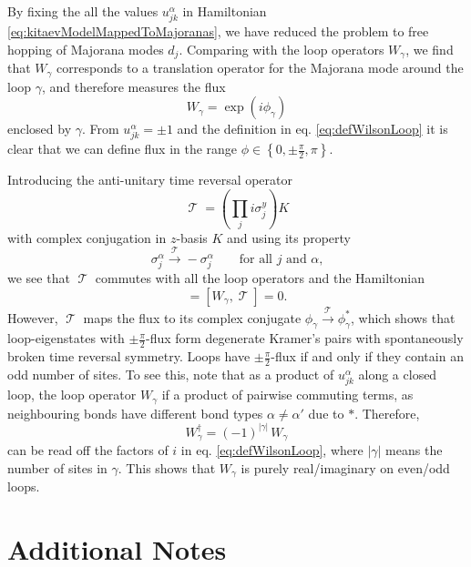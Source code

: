 \documentclass[%
fontsize=12pt, %
twoside=off %
]{scrbook}
\DeclareMathOperator{\trs}{\mathcal{T}}
\begin{document}
By fixing the all the values $u_{jk}^\alpha$ in Hamiltonian \ref{eq:kitaevModelMappedToMajoranas}, we have reduced the problem to free hopping of Majorana modes $d_j$. Comparing with the loop operators $W_\gamma$, we find that $W_\gamma$ corresponds to a translation operator for the Majorana mode around the loop $\gamma$, and therefore measures the flux
\begin{equation}
	W_\gamma = \exp\left(i \phi_\gamma\right)
\end{equation}
enclosed by $\gamma$. From $u_{jk}^\alpha=\pm 1$ and the definition in eq. \ref{eq:defWilsonLoop} it is clear that we can define flux in the range $\phi\in\left\{0,\pm\frac{\pi}{2},\pi\right\}$. 

Introducing the anti-unitary time reversal operator
\begin{equation}
	\trs = \left(\prod_j i\sigma_j^y\right)K
\end{equation}
with complex conjugation in $z$-basis $K$ and using its property
\begin{equation}
	\sigma_j^\alpha\stackrel{\trs}{\rightarrow}-\sigma_j^\alpha\qquad\text{for all $j$ and $\alpha$,}
\end{equation} 
we see that $\trs$ commutes with all the loop operators and the Hamiltonian
\begin{equation}
	[H,\trs] = [W_\gamma, \trs] = 0.
\end{equation}
However, $\trs$ maps the flux to its complex conjugate $\phi_\gamma \stackrel{\trs}{\to}\phi_\gamma^\ast$, which shows that loop-eigenstates with $\pm \frac{\pi}{2}$-flux form degenerate Kramer's pairs with spontaneously broken time reversal symmetry. Loops have $\pm \frac{\pi}{2}$-flux if and only if they contain an odd number of sites. To see this, note that as a product of $u_{jk}^\alpha$ along a closed loop, the loop operator $W_\gamma$ if a product of pairwise commuting terms, as neighbouring bonds have different bond types $\alpha\neq\alpha'$ due to $\ast$. Therefore,
\begin{equation}
	W_\gamma^\dagger=(-1)^{|\gamma|} \,W_\gamma
\end{equation}
can be read off the factors of $i$ in eq. \ref{eq:defWilsonLoop}, where $|\gamma|$ means the number of sites in $\gamma$. This shows that $W_\gamma$ is purely real/imaginary on even/odd loops.

\chapter{Additional Notes}
\end{document}
